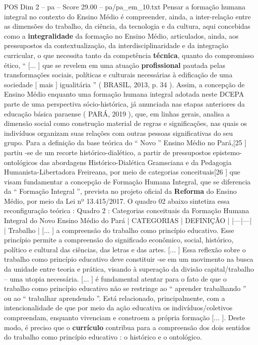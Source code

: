 \begin{textsample}{POS Dim 2 – pa – Score 29.00 – pa/pa\_em\_10.txt}
Pensar a formação humana integral no contexto do Ensino Médio é compreender, ainda, a inter-relação entre as dimensões do trabalho, da ciência, da tecnologia e da cultura, aqui concebidas como a \textbf{integralidade} da formação no Ensino Médio, articulados, ainda, aos pressupostos da contextualização, da interdisciplinaridade e da integração curricular, o que necessita tanto da competência \textbf{técnica}, quanto do compromisso ético, “ [... ] que se revelem em uma atuação \textbf{profissional} pautada pelas transformações sociais, políticas e culturais necessárias à edificação de uma sociedade [ mais ] igualitária ” ( BRASIL, 2013, p. 34 ).
Assim, a concepção de Ensino Médio enquanto uma formação humana integral adotada neste DCEPA parte de uma perspectiva sócio-histórica, já anunciada nas etapas anteriores da educação básica paraense ( PARÁ, 2019 ), que, em linhas gerais, analisa a dimensão social como construção material de regras e significações, nas quais os indivíduos organizam suas relações com outras pessoas significativas do seu grupo.
Para a definição da base teórica do “ Novo ” Ensino Médio no Pará,[25 ] partiu -se de um recorte histórico-dialético, a partir de pressupostos epistemo-ontológicos das abordagens Histórico-Dialética Gramsciana e da Pedagogia Humanista-Libertadora Freireana, por meio de categorias conceituais[26 ] que visam fundamentar a concepção de Formação Humana Integral, que se diferencia da “ Formação Integral ”, prevista no projeto oficial da \textbf{Reforma} do Ensino Médio, por meio da Lei nº 13.415/2017.
O quadro 02 abaixo sintetiza essa reconfiguração teórica : Quadro 2 : Categorias conceituais da Formação Humana Integral do Novo Ensino Médio do Pará | CATEGORIAS | DEFINIÇÃO | |---|---| | Trabalho | [... ] a compreensão do trabalho como princípio educativo.
Esse princípio permite a compreensão do significado econômico, social, histórico, político e cultural das ciências, das letras e das artes. [... ] Essa reflexão sobre o trabalho como princípio educativo deve constituir -se em um movimento na busca da unidade entre teoria e prática, visando à superação da divisão capital/trabalho – uma utopia necessária. [... ] é fundamental atentar para o fato de que o trabalho como princípio educativo não se restringe ao “ aprender trabalhando ” ou ao “ trabalhar aprendendo ”.
Está relacionado, principalmente, com a intencionalidade de que por meio da ação educativa os indivíduos/coletivos compreendam, enquanto vivenciam e constroem a própria formação [... ].
Deste modo, é preciso que o \textbf{currículo} contribua para a compreensão dos dois sentidos do trabalho como princípio educativo : o histórico e o ontológico.

\end{textsample}
